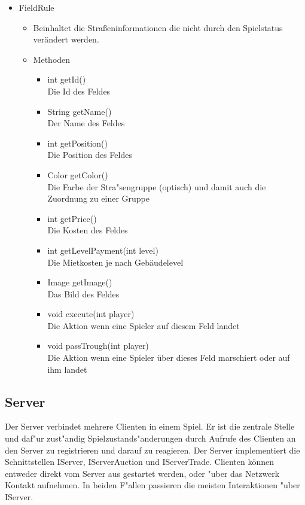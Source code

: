\documentclass[a4paper,10pt]{article}
\begin{document}
\begin{itemize}
\item FieldRule
\begin{itemize}
\item Beinhaltet die Straßeninformationen die nicht durch den Spielstatus verändert werden.
\item Methoden
\begin{itemize}
\item int getId()
\\Die Id des Feldes
\item String getName()
\\Der Name des Feldes
\item int getPosition()
\\Die Position des Feldes
\item Color getColor()
\\Die Farbe der Stra"sengruppe (optisch) und damit auch die Zuordnung zu einer Gruppe
\item int getPrice()
\\Die Kosten des Feldes
\item int getLevelPayment(int level)
\\Die Mietkosten je nach Gebäudelevel
\item Image getImage()
\\Das Bild des Feldes
\item void execute(int player)
\\Die Aktion wenn eine Spieler auf diesem Feld landet
\item void passTrough(int player)
\\Die Aktion wenn eine Spieler über dieses Feld marschiert oder auf ihm landet
\end{itemize}
\end{itemize}
\end{itemize}

\subsection{Server}

Der Server verbindet mehrere Clienten in einem Spiel. Er ist die zentrale Stelle und daf"ur zust"andig Spielzustands"anderungen durch Aufrufe des Clienten an den Server zu registrieren und darauf zu reagieren. Der Server implementiert die Schnittstellen IServer, IServerAuction und IServerTrade. Clienten können entweder direkt vom Server aus gestartet werden, oder "uber das Netzwerk Kontakt aufnehmen. In beiden F"allen passieren die meisten Interaktionen "uber IServer.
\end{document}
